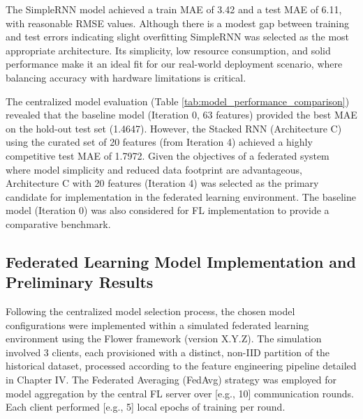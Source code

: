 The SimpleRNN model achieved a train MAE of 3.42 and a test MAE of 6.11, with reasonable RMSE values. Although there is a modest gap between training and test errors  indicating slight overfitting  SimpleRNN was selected as the most appropriate architecture. Its simplicity, low resource consumption, and solid performance make it an ideal fit for our real-world deployment scenario, where balancing accuracy with hardware limitations is critical.

The centralized model evaluation (Table \ref{tab:model_performance_comparison}) revealed that the baseline model (Iteration 0, 63 features) provided the best MAE on the hold-out test set (1.4647). However, the Stacked RNN (Architecture C) using the curated set of 20 features (from Iteration 4) achieved a highly competitive test MAE of 1.7972. Given the objectives of a federated system where model simplicity and reduced data footprint are advantageous, Architecture C with 20 features (Iteration 4) was selected as the primary candidate for implementation in the federated learning environment. The baseline model (Iteration 0) was also considered for FL implementation to provide a comparative benchmark.

\subsection{Federated Learning Model Implementation and Preliminary Results}
\label{ssec:fl_results}
Following the centralized model selection process, the chosen model configurations were implemented within a simulated federated learning environment using the Flower framework (version X.Y.Z). The simulation involved 3 clients, each provisioned with a distinct, non-IID partition of the historical dataset, processed according to the feature engineering pipeline detailed in Chapter IV. The Federated Averaging (FedAvg) strategy was employed for model aggregation by the central FL server over [e.g., 10] communication rounds. Each client performed [e.g., 5] local epochs of training per round.

